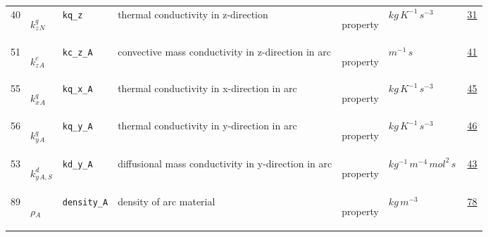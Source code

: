 \begin{longtable}{|p{1cm}|p{2.5cm}|p{4.5cm}|p{8cm}|p{3.0cm}|p{3cm}|p{1cm}|}
                 \\
            40
             & \hypertarget{"v:40"}{ $ {{k^q_z}}{_{N}} $}
             & \verb|kq_z|
             & thermal conductivity in z-direction
             & \begin{lay}property \end{lay}
             & $ kg \,K^{-1} \,s^{-3} \, $
             &                 \hyperlink{"e:31"}{ 31 }
                 \\
            51
             & \hypertarget{"v:51"}{ $ {{k^c_z}}{_{A}} $}
             & \verb|kc_z_A|
             &  convective mass conductivity in z-direction in arc
             & \begin{lay}property \end{lay}
             & $ m^{-1} \,s \, $
             &                 \hyperlink{"e:41"}{ 41 }
                 \\
            55
             & \hypertarget{"v:55"}{ $ {{k^q_x}}{_{A}} $}
             & \verb|kq_x_A|
             & thermal conductivity in x-direction in arc
             & \begin{lay}property \end{lay}
             & $ kg \,K^{-1} \,s^{-3} \, $
             &                 \hyperlink{"e:45"}{ 45 }
                 \\
            56
             & \hypertarget{"v:56"}{ $ {{k^q_y}}{_{A}} $}
             & \verb|kq_y_A|
             & thermal conductivity in y-direction in arc
             & \begin{lay}property \end{lay}
             & $ kg \,K^{-1} \,s^{-3} \, $
             &                 \hyperlink{"e:46"}{ 46 }
                 \\
            53
             & \hypertarget{"v:53"}{ $ {{k^d_y}}{_{A, S}} $}
             & \verb|kd_y_A|
             & diffusional mass conductivity in y-direction in arc
             & \begin{lay}property \end{lay}
             & $ kg^{-1} \,m^{-4} \,mol^{2} \,s \, $
             &                 \hyperlink{"e:43"}{ 43 }
                 \\
            89
             & \hypertarget{"v:89"}{ $ {\rho}{_{A}} $}
             & \verb|density_A|
             & density of arc material
             & \begin{lay}property \end{lay}
             & $ kg \,m^{-3} \, $
             &                 \hyperlink{"e:78"}{ 78 }

\end{longtable}
